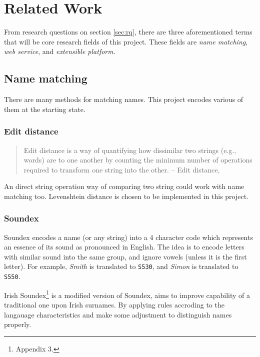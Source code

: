 \chapter{Related Work}
\label{ch:relatedwork}

From research questions on section \ref{sec:rq}, there are three aforementioned
terms that will be core research fields of this project.
These fields are \emph{name matching}, \emph{web service},
and \emph{extensible platform}.

\section{Name matching}

There are many methods for matching names. This project encodes
various of them at the starting state.

\subsection{Edit distance}

\begin{quotation} \noindent
Edit distance is a way of quantifying how dissimilar two strings
(e.g., words) are to one another by counting the minimum number
of operations required to transform one string into the other.
-- Edit distance, \citet{editdistance}
\end{quotation}

\noindent An direct string operation way of comparing two string
could work with name matching too. Levenshtein distance \citep{levenshteindistance}
is chosen to be implemented in this project.

\subsection{Soundex}

Soundex \cite{soundex} encodes a name (or any string) into a 4 character code
which represents an essence of its sound as pronounced in English.
The idea is to encode letters with similar sound into the same group,
and ignore vowels (unless it is the first letter).
For example, \emph{Smith} is translated to \texttt{S530}, and
\emph{Simon} is translated to \texttt{S550}.

Irish Soundex\footnote{\cite{adamw} Appendix 3.}
is a modified version of Soundex,
aims to improve capability of a traditional one upon Irish surnames.
By applying rules accroding to the langauage characteristics and
make some adjustment to distinguish names properly.

